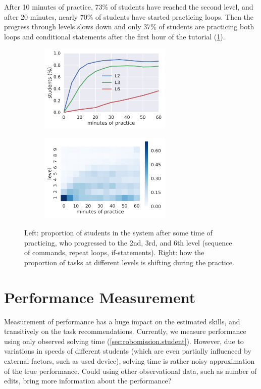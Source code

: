 After 10 minutes of practice, 73\% of students have reached the second level,
and after 20 minutes, nearly 70\% of students have started practicing loops.
Then the progress through levels slows down and only 37\% of students
are practicing both loops and conditional statements after the first
hour of the tutorial (\cref{fig:students-at-levels}).

\begin{figure}[htb]
\centering
\begin{subfigure}{.49\textwidth}
\centering
\includegraphics[height=42mm]{img/students-at-levels}
\end{subfigure}
\begin{subfigure}{.49\textwidth}
\centering
\includegraphics[height=42mm]{img/task-sessions-at-levels}
\end{subfigure}
\caption{%
  Left: proportion of students in the system after some time of practicing,
  who progressed to the 2nd, 3rd, and 6th level (sequence of commands, repeat loops, if-statements).
  Right: how the proportion of tasks at different levels is shifting during the practice.}
\label{fig:students-at-levels}
\end{figure}

\section{Performance Measurement}

Measurement of performance has a huge impact on the estimated skills, %
and transitively on %
the task recommendations. %
Currently, we measure %
performance using only observed solving time
(\cref{sec:robomission.student}).
However, due to variations in speeds of different students
(which are even partially influenced by external factors, such as used device),
solving time is rather noisy approximation of the true performance.
Could using other observational data, such as number of edits,
bring more information about the performance?

